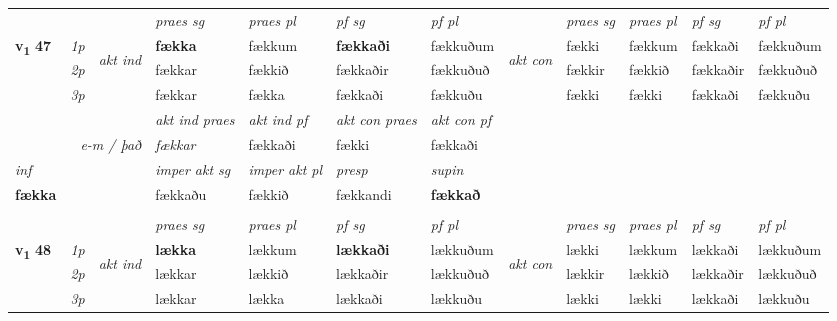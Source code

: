 \begin{longtable}[l]{X>{\footnotesize\itshape}llXXXXlXXXX}
 & &   & \textit{praes sg}  & \textit{praes pl}    & \textit{ pf sg} & \textit{pf pl} & & \textit{praes sg}  & \textit{praes pl}    & \textit{pf sg} & \textit{pf pl }  \\ \cmidrule{4-7} \cmidrule{9-12}
 \multirow{2}{*}{{{\textbf{v{\textsubscript{1}}} \Large{\textbf{47}}}}}  & 1p & \multirow{3}{*}{\begin{turn}{90}\textit{akt ind}\end{turn}} & \textbf{fækka} & fækkum & \textbf{fækkaði} & fækkuðum & \multirow{3}{*}{\begin{turn}{90}\textit{akt con}\end{turn}} &fækki & fækkum & fækkaði & fækkuðum\\*
 & 2p &  &  fækkar  & fækkið & fækkaðir & fækkuðuð & & fækkir & fækkið & fækkaðir & fækkuðuð \\*
 & 3p &  & fækkar & fækka & fækkaði & fækkuðu & & fækki & fækki& fækkaði & fækkuðu \\*
\cmidrule{4-7} \cmidrule{9-12}

   && &  \textit{akt ind praes} & \textit{akt ind pf} & \textit{akt con praes} & \textit{akt con pf} \\*
\multicolumn{3}{r}{\textit{e-m / það}} & fækkar & fækkaði & fækki & fækkaði \\*

\cmidrule{4-7}
   {\textit{inf}} & &  & \textit{imper akt sg} & \textit{imper akt pl}   & \textit{presp} & \textit{supin}   \\*
  {\textbf{fækka}} & && fækkaðu  & fækkið   & fækkandi &  \textbf{fækkað}   \\*

\midrule


  & \\
   \midrule
 & &   & \textit{praes sg}  & \textit{praes pl}    & \textit{ pf sg} & \textit{pf pl} & & \textit{praes sg}  & \textit{praes pl}    & \textit{pf sg} & \textit{pf pl }  \\ \cmidrule{4-7} \cmidrule{9-12}
 \multirow{2}{*}{{{\textbf{v{\textsubscript{1}}} \Large{\textbf{48}}}}}  & 1p & \multirow{3}{*}{\begin{turn}{90}\textit{akt ind}\end{turn}} & \textbf{lækka} & lækkum & \textbf{lækkaði} & lækkuðum & \multirow{3}{*}{\begin{turn}{90}\textit{akt con}\end{turn}} &lækki & lækkum & lækkaði & lækkuðum\\*
 & 2p &  &  lækkar  & lækkið & lækkaðir & lækkuðuð & & lækkir & lækkið & lækkaðir & lækkuðuð \\*
 & 3p &  & lækkar & lækka & lækkaði & lækkuðu & & lækki & lækki& lækkaði & lækkuðu \\*
\cmidrule{4-7} \cmidrule{9-12}


\end{longtable}
